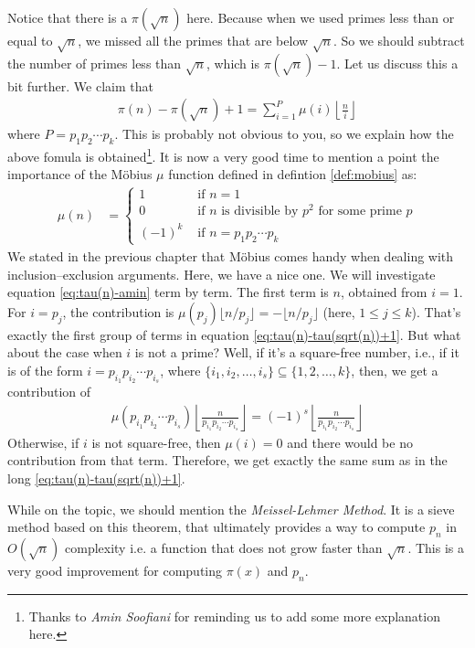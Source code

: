 \documentclass{subfiles}
\begin{document}
	Notice that there is a $\pi(\sqrt{n})$ here. Because when we used primes less than or equal to $\sqrt{n}$, we missed all the primes that are below $\sqrt{n}$. So we should subtract the number of primes less than $\sqrt{n}$, which is $\pi(\sqrt{n})-1$. Let us discuss this a bit further. We claim that
	\begin{align}
		\pi(n) -\pi(\sqrt{n})+1 = \sum_{i=1}^{P}\mu(i)\left\lfloor\frac{n}{i}\right\rfloor \label{eq:tau(n)-amin}
	\end{align}
	where $P=p_1p_2\cdots p_k$. This is probably not obvious to you, so we explain how the above fomula is obtained\footnote{Thanks to \textit{Amin Soofiani} for reminding us to add some more explanation here.}. It is now a very good time to mention a point the importance of the M\" obius $\mu$ function defined in defintion \eqref{def:mobius} as:
	\begin{align*}
		\mu(n) & =
		\begin{cases}
			1&\mbox{ if }n=1\\
			0&\mbox{ if }n
			\mbox{ is divisible by }p^2
			\mbox{ for some prime }p\\
			(-1)^k&\mbox{ if }n=p_1p_2\cdots p_k
		\end{cases}
	\end{align*}
	We stated in the previous chapter that M\" obius comes handy when dealing with inclusion--exclusion arguments. Here, we have a nice one. We will investigate equation \eqref{eq:tau(n)-amin} term by term. The first term is $n$, obtained from $i=1$. For $i=p_j$, the contribution is $\mu(p_j)\lfloor n/p_j \rfloor=-\lfloor n/p_j \rfloor$ (here, $1 \leq j \leq k$). That's exactly the first group of terms in equation \eqref{eq:tau(n)-tau(sqrt(n))+1}. But what about the case when $i$ is not a prime? Well, if it's a square-free number, i.e., if it is of the form $i=p_{i_1}p_{i_2}\cdots p_{i_s}$, where $\{i_1, i_2, \ldots, i_s\} \subseteq \{1,2,\ldots,k\}$, then, we get a contribution of
	\begin{align*}
		\mu(p_{i_1}p_{i_2}\cdots p_{i_s}) \left\lfloor\frac{n}{p_{i_1}p_{i_2}\cdots p_{i_s}}\right\rfloor = (-1)^s\left\lfloor\frac{n}{p_{i_1}p_{i_2}\cdots p_{i_s}}\right\rfloor
	\end{align*}
	Otherwise, if $i$ is not square-free, then $\mu(i)=0$ and there would be no contribution from that term. Therefore, we get exactly the same sum as in the long \eqref{eq:tau(n)-tau(sqrt(n))+1}.


	While on the topic, we should mention the \textit{Meissel-Lehmer Method}. It is a sieve method based on this theorem, that ultimately provides a way to compute $p_n$ in $O(\sqrt{n})$ complexity i.e. a function that does not grow faster than $\sqrt{n}$. This is a very good improvement for computing $\pi(x)$ and $p_n$.
\end{document}
